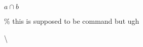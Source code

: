 \documentclass{article}
\begin{document}
\title{}
\author{Crème Brûlee\\Tübingen}
\date{}
\maketitle

$a\cap b$\par
\% this is supposed to be command but ugh\par
\textbackslash
\end{document}

